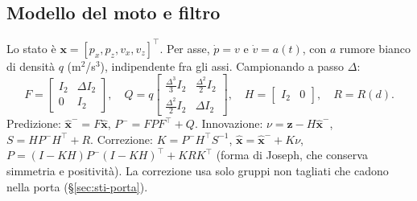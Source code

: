 \subsection{Modello del moto e filtro}\label{sec:sti-filtro}

Lo stato è $\mathbf x=[p_x,p_z,v_x,v_z]^{\top}$. Per asse, $\dot p=v$ e $\dot v=a(t)$, con $a$ rumore bianco di densità $q$ (m$^2$/s$^3$), indipendente fra gli assi. Campionando a passo $\Delta$:
\begin{equation}\label{eq:sti-modello}
F=\begin{bmatrix}I_2&\Delta I_2\\0&I_2\end{bmatrix},\quad
Q=q\begin{bmatrix}\tfrac{\Delta^3}{3}I_2&\tfrac{\Delta^2}{2}I_2\\[2pt]\tfrac{\Delta^2}{2}I_2&\Delta I_2\end{bmatrix},\quad
H=\begin{bmatrix}I_2&0\end{bmatrix},\quad R=R(d).
\end{equation}
Predizione: $\hat{\mathbf x}^-=F\hat{\mathbf x}$, $P^-=FPF^{\top}+Q$. Innovazione: $\nu=\mathbf z-H\hat{\mathbf x}^-$, $S=HP^-H^{\top}+R$. Correzione: $K=P^-H^{\top}S^{-1}$, $\hat{\mathbf x}=\hat{\mathbf x}^-+K\nu$, $P=(I-KH)P^-(I-KH)^{\top}+KRK^{\top}$ (forma di Joseph, che conserva simmetria e positività). La correzione usa solo gruppi non tagliati che cadono nella porta (\S\ref{sec:sti-porta}).

